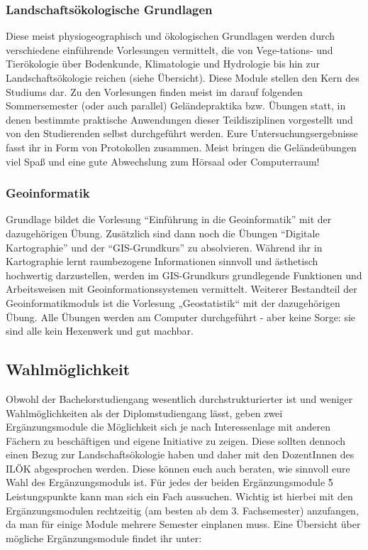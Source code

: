 \subsubsection*{Landschaftsökologische Grundlagen}
Diese meist physiogeographisch und ökologischen Grundlagen werden durch verschiedene einführende Vorlesungen vermittelt, die von Vege-tations- und Tierökologie über Bodenkunde, Klimatologie und Hydrologie bis hin zur Landschaftsökologie reichen (siehe Übersicht). Diese Module stellen den Kern des Studiums dar. Zu den Vorlesungen ﬁnden meist im darauf folgenden Sommersemester (oder auch parallel) Geländepraktika bzw. Übungen statt, in denen bestimmte praktische Anwendungen dieser Teildisziplinen vorgestellt und von den Studierenden selbst durchgeführt werden. Eure Untersuchungsergebnisse fasst ihr in Form von Protokollen zusammen. Meist bringen die Geländeübungen viel Spaß und eine gute Abwechslung zum Hörsaal oder Computerraum!

\subsubsection*{Geoinformatik}
Grundlage bildet die Vorlesung \enquote{Einführung in die Geoinformatik} mit der dazugehörigen Übung. Zusätzlich sind dann noch die Übungen \enquote{Digitale Kartographie} und der \enquote{GIS-Grundkurs} zu absolvieren. Während ihr in Kartographie lernt raumbezogene Informationen sinnvoll und ästhetisch hochwertig darzustellen, werden im GIS-Grundkurs  grundlegende Funktionen und Arbeitsweisen mit Geoinformationssystemen vermittelt. Weiterer Bestandteil der Geoinformatikmoduls ist die Vorlesung „Geostatistik“ mit der dazugehörigen Übung. Alle Übungen werden am Computer durchgeführt - aber keine Sorge: sie sind alle kein Hexenwerk und gut machbar.

\subsection*{Wahlmöglichkeit}
Obwohl der Bachelorstudiengang wesentlich durchstrukturierter ist und weniger Wahlmöglichkeiten als der Diplomstudiengang lässt, geben zwei Ergänzungsmodule die Möglichkeit sich je nach Interessenlage mit anderen Fächern zu beschäftigen und eigene Initiative zu zeigen. Diese sollten dennoch einen Bezug zur Landschaftsökologie haben und daher mit den DozentInnen des ILÖK abgesprochen werden. Diese können euch auch beraten, wie sinnvoll eure Wahl des Ergänzungsmoduls ist. Für jedes der beiden Ergänzungsmodule \` 5 Leistungspunkte kann man sich ein Fach aussuchen. Wichtig ist hierbei mit den Ergänzungsmodulen rechtzeitig (am besten ab dem 3. Fachsemester) anzufangen, da man für einige Module mehrere Semester einplanen muss. Eine Übersicht über mögliche Ergänzungsmodule ﬁndet ihr unter:

